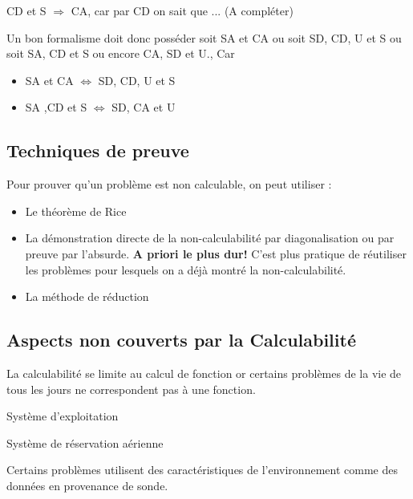 \begin{myprop}
	CD et S $\Rightarrow$ CA, car par CD on sait que ... (A compléter)
\end{myprop}

Un bon formalisme doit donc posséder soit SA et CA ou soit SD, CD, U et S ou 
soit SA, CD et S ou encore CA, SD et U., Car
\begin{itemize}
	\item SA et CA $\iff$ SD, CD, U et S
	\item SA ,CD et S $\iff$ SD, CA et U
\end{itemize}

\subsection{Techniques de preuve}
\label{sub:techniques_de_preuve}

Pour prouver qu'un problème est non calculable, on peut utiliser :
\begin{itemize}
	\item Le théorème de Rice
	\item La démonstration directe de la non-calculabilité par 
		diagonalisation ou par preuve par l'absurde. 
		\textbf{A priori le plus dur!} C'est plus pratique de réutiliser les problèmes pour 
		lesquels on a déjà montré la non-calculabilité.
	\item La méthode de réduction
\end{itemize}

\subsection{Aspects non couverts par la Calculabilité}
\label{sub:aspects_non_couvert_par_la_calculabilit_}
La calculabilité se limite au calcul de fonction or certains problèmes de la vie 
de tous les jours ne correspondent pas à une fonction.

\begin{myexem}
	Système d'exploitation
\end{myexem}

\begin{myexem}
	Système de réservation aérienne
\end{myexem}

\begin{myexem}
	Certains problèmes utilisent des caractéristiques de l'environnement comme 
	des données en provenance de sonde.
\end{myexem}

